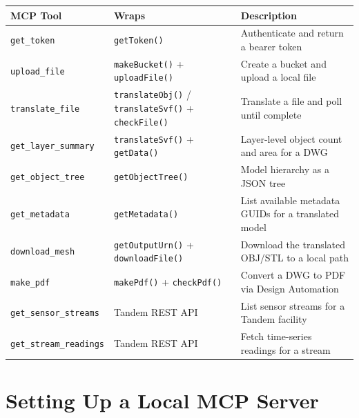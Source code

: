 \documentclass[
  11pt,
  letterpaper,
  DIV=11,
  numbers=noendperiod]{scrreprt}
\begin{document}
\begin{longtable}[]{@{}
  >{\raggedright\arraybackslash}p{}
  >{\raggedright\arraybackslash}p{}
  >{\raggedright\arraybackslash}p{}@{}}
\toprule\noalign{}
\begin{minipage}[b]{\linewidth}\raggedright
MCP Tool
\end{minipage} & \begin{minipage}[b]{\linewidth}\raggedright
Wraps
\end{minipage} & \begin{minipage}[b]{\linewidth}\raggedright
Description
\end{minipage} \\
\midrule\noalign{}
\endhead
\bottomrule\noalign{}
\endlastfoot
\texttt{get\_token} & \texttt{getToken()} & Authenticate and return a
bearer token \\
\texttt{upload\_file} & \texttt{makeBucket()} + \texttt{uploadFile()} &
Create a bucket and upload a local file \\
\texttt{translate\_file} & \texttt{translateObj()} /
\texttt{translateSvf()} + \texttt{checkFile()} & Translate a file and
poll until complete \\
\texttt{get\_layer\_summary} & \texttt{translateSvf()} +
\texttt{getData()} & Layer-level object count and area for a DWG \\
\texttt{get\_object\_tree} & \texttt{getObjectTree()} & Model hierarchy
as a JSON tree \\
\texttt{get\_metadata} & \texttt{getMetadata()} & List available
metadata GUIDs for a translated model \\
\texttt{download\_mesh} & \texttt{getOutputUrn()} +
\texttt{downloadFile()} & Download the translated OBJ/STL to a local
path \\
\texttt{make\_pdf} & \texttt{makePdf()} + \texttt{checkPdf()} & Convert
a DWG to PDF via Design Automation \\
\texttt{get\_sensor\_streams} & Tandem REST API & List sensor streams
for a Tandem facility \\
\texttt{get\_stream\_readings} & Tandem REST API & Fetch time-series
readings for a stream \\
\end{longtable}

\section{Setting Up a Local MCP
Server}\label{setting-up-a-local-mcp-server}
\end{document}
